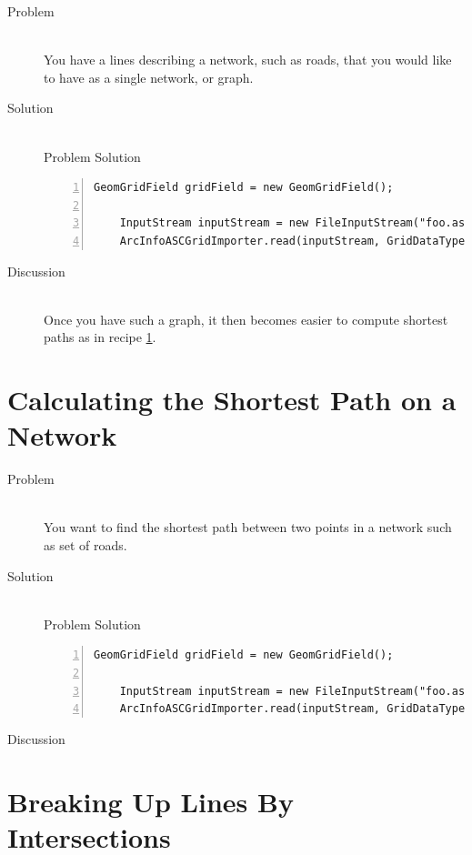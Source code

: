 \documentclass[twoside,10pt]{book}
\begin{document}
\begin{description}
\item[Problem]~\\
You have a lines describing a network, such as roads, that you would like to have as a single network, or graph.

\item[Solution]~\\
Problem Solution
\begin{Verbatim}[frame=lines,framesep=5mm,numbers=left,commandchars=+\[\]]
	GeomGridField gridField = new GeomGridField();
	
	InputStream inputStream = new FileInputStream("foo.asc");
	ArcInfoASCGridImporter.read(inputStream, GridDataType.INTEGER, gridField);
\end{Verbatim}

\item[Discussion]~\\
Once you have such a graph, it then becomes easier to compute shortest paths as in recipe \ref{sec:shortestpaths}.
\end{description}





\section{Calculating the Shortest Path on a Network}
\label{sec:shortestpaths}

\begin{description}
\item[Problem]~\\
You want to find the shortest path between two points in a network
such as set of roads.

\item[Solution]~\\
Problem Solution
\begin{Verbatim}[frame=lines,framesep=5mm,numbers=left,commandchars=+\[\]]
	GeomGridField gridField = new GeomGridField();
	
	InputStream inputStream = new FileInputStream("foo.asc");
	ArcInfoASCGridImporter.read(inputStream, GridDataType.INTEGER, gridField);
\end{Verbatim}

\item[Discussion ]
\end{description}


\section{Breaking Up Lines By Intersections}
\label{sec:NodingLines}
\end{document}
